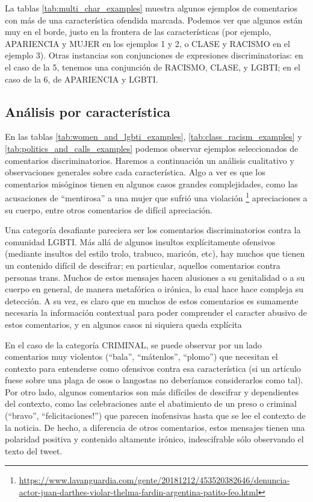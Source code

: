 La tablas \ref{tab:multi_char_examples} muestra algunos ejemplos de comentarios con más de una característica ofendida marcada. Podemos ver que algunos están muy en el borde, justo en la frontera de las características (por ejemplo, APARIENCIA y MUJER en los ejemplos 1 y 2, o CLASE y RACISMO en el ejemplo 3). Otras instancias son conjunciones de expresiones discriminatorias: en el caso de la 5, tenemos una conjunción de RACISMO, CLASE, y LGBTI; en el caso de la 6, de APARIENCIA y LGBTI.



\subsection{Análisis por característica}



En las tablas \ref{tab:women_and_lgbti_examples}, \ref{tab:class_racism_examples} y \ref{tab:politics_and_calls_examples} podemos observar ejemplos seleccionados de comentarios discriminatorios. Haremos a continuación un análisis cualitativo y observaciones generales sobre cada característica. Algo a ver es que los comentarios misóginos tienen en algunos casos grandes complejidades, como las acusaciones de ``mentirosa'' a una mujer que sufrió una violación \footnote{\url{https://www.lavanguardia.com/gente/20181212/453520382646/denuncia-actor-juan-darthes-violar-thelma-fardin-argentina-patito-feo.html}} apreciaciones a su cuerpo, entre otros comentarios de difícil apreciación.

Una categoría desafiante pareciera ser los comentarios discriminatorios contra la comunidad LGBTI. Más allá de algunos insultos explícitamente ofensivos (mediante insultos del estilo trolo, trabuco, maricón, etc), hay muchos que tienen un contenido difícil de descifrar; en particular, aquellos comentarios contra personas trans. Muchos de estos mensajes hacen alusiones a su genitalidad o a su cuerpo en general, de manera metafórica o irónica, lo cual hace hace compleja su detección. A su vez, es claro que en muchos de estos comentarios es sumamente necesaria la información contextual para poder comprender el caracter abusivo de estos comentarios, y en algunos casos ni siquiera queda explícita

En el caso de la categoría CRIMINAL, se puede observar por un lado comentarios muy violentos (``bala'', ``mátenlos'', ``plomo'') que necesitan el contexto para entenderse como ofensivos contra esa característica (si un artículo fuese sobre una plaga de osos o langostas no deberíamos considerarlos como tal). Por otro lado, algunos comentarios son más difíciles de descifrar y dependientes del contexto, como las celebraciones ante el abatimiento de un preso o criminal (``bravo'', ``felicitaciones!'') que parecen inofensivas hasta que se lee el contexto de la noticia. De hecho, a diferencia de otros comentarios, estos mensajes tienen una polaridad positiva y contenido altamente irónico, indescifrable sólo observando el texto del tweet.

